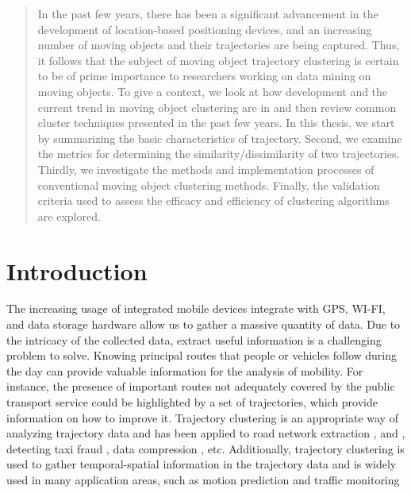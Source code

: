 \documentclass[a4paper, 12pt]{article}
\begin{document}



\tableofcontents

\listoftables

\listoffigures

\listofmyequations

\cleardoublepage

\begin{abstract} 
In the past few years, there has been a significant advancement in the development of location-based positioning devices, and an increasing number of moving objects and their trajectories are being captured. Thus, it follows that the subject of moving object trajectory clustering is certain to be of prime importance to researchers working on data mining on moving objects. To give a context, we look at how development and the current trend in moving object clustering are in and then review common cluster techniques presented in the past few years.  In this thesis, we start by summarizing the basic characteristics of trajectory. Second, we examine the metrics for determining the similarity/dissimilarity of two trajectories. Thirdly, we investigate the methods and implementation processes of conventional moving object clustering methods. Finally, the validation criteria used to assess the efficacy and efficiency of clustering algorithms are explored. 
\end{abstract}

\pagebreak


\section{Introduction}
The increasing usage of integrated mobile devices integrate with GPS, WI-FI, and data storage hardware allow us to gather a massive quantity of data. Due to the intricacy of the collected data, extract useful information is a challenging problem to solve. Knowing principal routes that people or vehicles follow during the day can provide valuable information for the analysis of mobility. For instance, the presence of important routes not adequately covered by the public transport service could be highlighted by a set of trajectories, which provide information on how to improve it. Trajectory clustering is an appropriate way of analyzing trajectory data and has been applied to road network extraction \citep{mariescu2018cellnet}, \citep{ahmed2015comparison} and \citep{biagioni2012inferring}, detecting taxi fraud \citep{liu2013fraud}, data compression \citep{chen2012compression}, etc. Additionally, trajectory clustering is used to gather temporal-spatial information in the trajectory data and is widely used in many application areas, such as motion prediction \citep{chen2010searching} and traffic monitoring \citep{atev2006learning}
\end{document}
